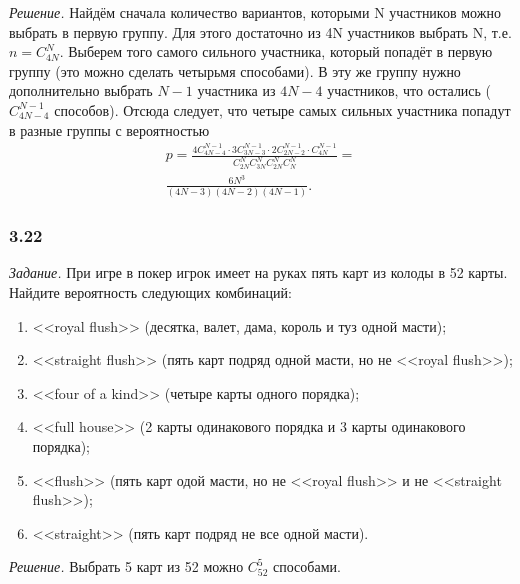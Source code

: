 \textit{Решение.} Найдём сначала количество вариантов, которыми N участников можно выбрать в первую группу.
Для этого достаточно из 4N участников выбрать N, т.е. $ n = C_{4N}^N $.
Выберем того самого сильного участника, который попадёт в первую группу (это можно сделать четырьмя способами).
В эту же группу нужно дополнительно выбрать $ N - 1 $ участника из $ 4N - 4 $ участников, что остались ($ C_{ 4N - 4 }^{ N - 1 } $ способов).
Отсюда следует, что четыре самых сильных участника попадут в разные группы с вероятностью
\begin{equation*}
\begin{split}
p =
\frac{4 C_{4N-4}^{N-1} \cdot 3 C_{3N-3}^{N-1} \cdot 2 C_{2N-2}^{N-1} \cdot C_{4N}^{N-1}}{C_{2N}^N C_{3N}^N C_{2N}^N C_{N}^N} = \\
\frac{6 N^3}{ \left(4N-3 \right) \left( 4N-2 \right) \left( 4N-1 \right) }.
\end{split}
\end{equation*}

\subsubsection*{3.22}

\textit{Задание.} При игре в покер игрок имеет на руках пять карт из колоды в 52 карты.
Найдите вероятность следующих комбинаций:
\begin{enumerate}[label=\alph*)]
\item <<royal flush>> (десятка, валет, дама, король и туз одной масти);
\item <<straight flush>> (пять карт подряд одной масти, но не <<royal flush>>);
\item <<four of a kind>> (четыре карты одного порядка);
\item <<full house>> (2 карты одинакового порядка и 3 карты одинакового порядка);
\item <<flush>> (пять карт одой масти, но не <<royal flush>> и не <<straight flush>>);
\item <<straight>> (пять карт подряд не все одной масти).
\end{enumerate}

\textit{Решение.} Выбрать 5 карт из 52 можно $ C_{52}^5 $ способами.

